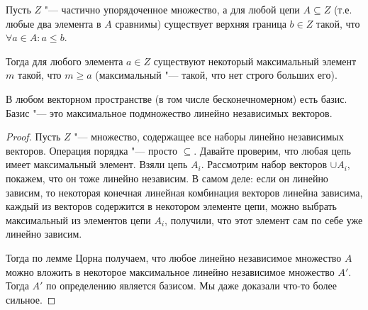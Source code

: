 \begin{lemma}[Цорн]
	Пусть $Z$ "--- частично упорядоченное множество, а для любой цепи $A \subseteq Z$
	(т.е. любые два элемента в $A$ сравнимы) существует верхняя граница $b \in Z$ такой, что $\forall a \in A \colon a \le b$.

	Тогда для любого элемента $a \in Z$ существуют некоторый максимальный элемент $m$ такой, что $m \ge a$
	(максимальный "--- такой, что нет строго больших его).
\end{lemma}
\begin{exmp}
	В любом векторном пространстве (в том числе бесконечномерном) есть базис.
	Базис "--- это максимальное подмножество линейно независимых векторов.
	\begin{proof}
		Пусть $Z$ "--- множество, содержащее все наборы линейно независимых векторов.
		Операция порядка "--- просто $\subseteq$.
		Давайте проверим, что любая цепь имеет максимальный элемент.
		Взяли цепь $A_i$.
		Рассмотрим набор векторов $\cup A_i$, покажем, что он тоже линейно независим.
		В самом деле: если он линейно зависим, то некоторая конечная линейная комбинация векторов
		линейна зависима, каждый из векторов содержится в некотором элементе цепи, можно выбрать
		максимальный из элементов цепи $A_i$, получили, что этот элемент сам по себе уже линейно зависим.

		Тогда по лемме Цорна получаем, что любое линейно независимое множество $A$ можно
		вложить в некоторое максимальное линейно независимое множество $A'$.
		Тогда $A'$ по определению является базисом.
		Мы даже доказали что-то более сильное.
	\end{proof}
\end{exmp}
